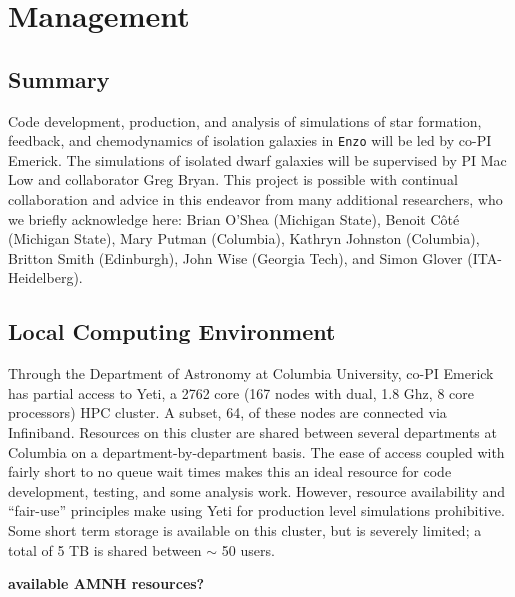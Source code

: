 \documentclass[11pt]{article}
\begin{document}
\section{Management}

\subsection{Summary}

Code development, production, and analysis of simulations of star formation, feedback, and chemodynamics of isolation galaxies in \texttt{Enzo} will be led by co-PI Emerick. The simulations of isolated dwarf galaxies will be supervised by PI Mac Low and collaborator Greg Bryan. This project is possible with continual collaboration and advice in this endeavor from many additional researchers, who we briefly acknowledge here: Brian O'Shea (Michigan State), Benoit C{\^o}t{\'e} (Michigan State), Mary Putman (Columbia), Kathryn Johnston (Columbia), Britton Smith (Edinburgh), John Wise (Georgia Tech), and Simon Glover (ITA-Heidelberg).

\subsection{Local Computing Environment}

Through the Department of Astronomy at Columbia University, co-PI Emerick has partial access to Yeti, a 2762 core (167 nodes with dual, 1.8 Ghz, 8 core processors) HPC cluster. A subset, 64, of these nodes are connected via Infiniband. Resources on this cluster are shared between several departments at Columbia on a department-by-department basis. The ease of access coupled with fairly short to no queue wait times makes this an ideal resource for code development, testing, and some analysis work. However, resource availability and ``fair-use'' principles make using Yeti for production level simulations prohibitive. Some short term storage is available on this cluster, but is severely limited; a total of 5 TB is shared between $\sim$ 50 users.

{\bf available AMNH resources?}




\end{document}
